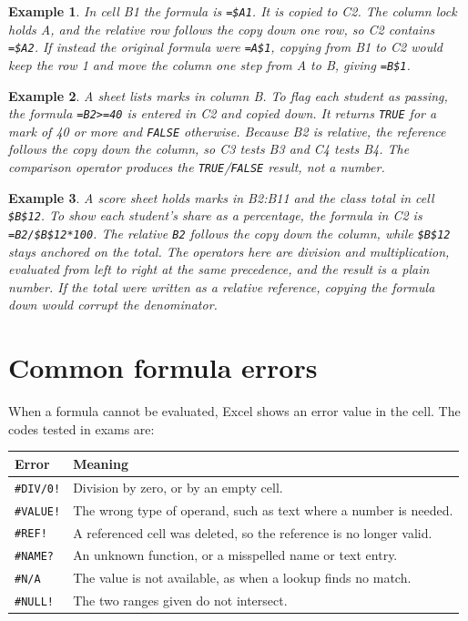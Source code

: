 \documentclass[11pt]{article}
\newtheorem{example}{Example}[section]
\begin{document}
\begin{example}
In cell B1 the formula is \texttt{=\$A1}. It is copied to C2. The column lock
holds A, and the relative row follows the copy down one row, so C2 contains
\texttt{=\$A2}. If instead the original formula were \texttt{=A\$1}, copying
from B1 to C2 would keep the row 1 and move the column one step from A to B,
giving \texttt{=B\$1}.
\end{example}

\begin{example}
A sheet lists marks in column B. To flag each student as passing, the formula
\texttt{=B2>=40} is entered in C2 and copied down. It returns \texttt{TRUE}
for a mark of 40 or more and \texttt{FALSE} otherwise. Because B2 is relative,
the reference follows the copy down the column, so C3 tests B3 and C4 tests
B4. The comparison operator produces the \texttt{TRUE}/\texttt{FALSE} result,
not a number.
\end{example}

\begin{example}
A score sheet holds marks in B2:B11 and the class total in cell \texttt{\$B\$12}.
To show each student's share as a percentage, the formula in C2 is
\texttt{=B2/\$B\$12*100}. The relative \texttt{B2} follows the copy down the
column, while \texttt{\$B\$12} stays anchored on the total. The operators here
are division and multiplication, evaluated from left to right at the same
precedence, and the result is a plain number. If the total were written as a
relative reference, copying the formula down would corrupt the denominator.
\end{example}

\section{Common formula errors}
When a formula cannot be evaluated, Excel shows an error value in the cell.
The codes tested in exams are:

\begin{center}
\begin{tabular}{p{}p{}}
\toprule
\textbf{Error} & \textbf{Meaning} \\
\midrule
\texttt{\#DIV/0!} & Division by zero, or by an empty cell. \\
\texttt{\#VALUE!} & The wrong type of operand, such as text where a number is needed. \\
\texttt{\#REF!} & A referenced cell was deleted, so the reference is no longer valid. \\
\texttt{\#NAME?} & An unknown function, or a misspelled name or text entry. \\
\texttt{\#N/A} & The value is not available, as when a lookup finds no match. \\
\texttt{\#NULL!} & The two ranges given do not intersect. \\
\bottomrule
\end{tabular}
\end{center}
\end{document}
